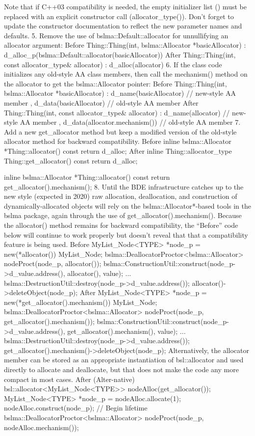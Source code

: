 {{{{{{{{Note that if C++03 compatibility is needed, the empty initializer list ({}) must be replaced with an explicit constructor call (allocator_type()). Don’t forget to update the constructor documentation to reflect the new parameter names and defaults.
5.	Remove the use of bslma::Default::allocator for unnullifying an allocator argument:
Before	Thing::Thing(int, bslma::Allocator *basicAllocator)
  : d_alloc_p(bslma::Default::allocator(basicAllocator))
After	Thing::Thing(int, const allocator_type& allocator)
  : d_alloc(allocator)
6.	If the class code initializes any old-style AA class members, then call the mechanism() method on the allocator to get the bslma::Allocator pointer:
Before	Thing::Thing(int, bslma::Allocator *basicAllocator)
  : d_name(basicAllocator)         // new-style AA member
  , d_data(basicAllocator)         // old-style AA member
After	Thing::Thing(int, const allocator_type& allocator)
  : d_name(allocator)              // new-style AA member
  , d_data(allocator.mechanism())  // old-style AA member
7.	Add a new get_allocator method but keep a modified version of the old-style allocator method for backward compatibility.
Before	inline bslma::Allocator *Thing::allocator() const
  { return d_alloc; }
After	inline Thing::allocator_type Thing::get_allocator() const
  { return d_alloc; }

inline bslma::Allocator *Thing::allocator() const
  { return get_allocator().mechanism(); }
8.	Until the BDE infrastructure catches up to the new style (expected in 2020) raw allocation, deallocation, and construction of dynamically-allocated objects will rely on the bslma::Allocator*-based tools in the bslma package, again through the use of get_allocator().mechanism(). Because the allocator() method remains for backward compatibility, the “Before” code below will continue to work properly but doesn’t reveal that that a compatibility feature is being used.
Before	MyList_Node<TYPE> *node_p = new(*allocator()) MyList_Node;
bslma::DeallocatorProctor<bslma::Allocator>
     nodeProct(node_p, allocator());
bslma::ConstructionUtil::construct(node_p->d_value.address(),
                                   allocator(), value);
...
bslma::DestructionUtil::destroy(node_p->d_value.address());
allocator()->deleteObject(node_p);
After	MyList_Node<TYPE> *node_p =
    new(*get_allocator().mechanism()) MyList_Node;
bslma::DeallocatorProctor<bslma::Allocator>
    nodeProct(node_p, get_allocator().mechanism());
bslma::ConstructionUtil::construct(node_p->d_value.address(),
                                 get_allocator().mechanism(),
                                 value);
...
bslma::DestructionUtil::destroy(node_p->d_value.address());
get_allocator().mechanism()->deleteObject(node_p);
Alternatively, the allocator member can be stored as an appropriate instantiation of bsl::allocator and used directly to allocate and deallocate, but that does not make the code any more compact in most cases.
After (Alter-native)	bsl::allocator<MyList_Node<TYPE>> nodeAlloc(get_allocator());
MyList_Node<TYPE> *node_p = nodeAlloc.allocate(1);
nodeAlloc.construct(node_p);  // Begin lifetime
bslma::DeallocatorProctor<bslma::Allocator>
nodeProct(node_p, nodeAlloc.mechanism());

}}}}}}}}

